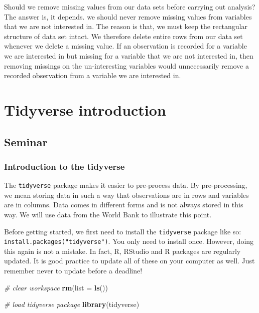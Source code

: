 \documentclass[]{article}
\newenvironment{Shaded}{\begin{snugshade}}{\end{snugshade}}
\newcommand{\CommentTok}[1]{\textcolor[rgb]{0.56,0.35,0.01}{\textit{#1}}}
\newcommand{\DataTypeTok}[1]{\textcolor[rgb]{0.13,0.29,0.53}{#1}}
\newcommand{\KeywordTok}[1]{\textcolor[rgb]{0.13,0.29,0.53}{\textbf{#1}}}
\newcommand{\NormalTok}[1]{#1}
\begin{document}
Should we remove missing values from our data sets before carrying out analysis? The answer is, it depends. we should never remove missing values from variables that we are not interested in. The reason is that, we must keep the rectangular structure of data set intact. We therefore delete entire rows from our data set whenever we delete a missing value. If an observation is recorded for a variable we are interested in but missing for a variable that we are not interested in, then removing missings on the un-interesting variables would unnecessarily remove a recorded observation from a variable we are interested in.

\hypertarget{tidyverse-introduction}{%
\section{Tidyverse introduction}\label{tidyverse-introduction}}

\hypertarget{seminar}{%
\subsection{Seminar}\label{seminar}}

\hypertarget{introduction-to-the-tidyverse}{%
\subsubsection{Introduction to the tidyverse}\label{introduction-to-the-tidyverse}}

The \texttt{tidyverse} package makes it easier to pre-process data. By pre-processing, we mean storing data in such a way that observations are in rows and variables are in columns. Data comes in different forms and is not always stored in this way. We will use data from the World Bank to illustrate this point.

Before getting started, we first need to install the \texttt{tidyverse} package like so: \texttt{install.packages("tidyverse")}. You only need to install once. However, doing this again is not a mistake. In fact, R, RStudio and R packages are regularly updated. It is good practice to update all of these on your computer as well. Just remember never to update before a deadline!

\begin{Shaded}
\begin{Highlighting}[]
\CommentTok{# clear workspace}
\KeywordTok{rm}\NormalTok{(}\DataTypeTok{list =} \KeywordTok{ls}\NormalTok{())}

\CommentTok{# load tidyverse package}
\KeywordTok{library}\NormalTok{(tidyverse)}
\end{Highlighting}
\end{Shaded}
\end{document}
